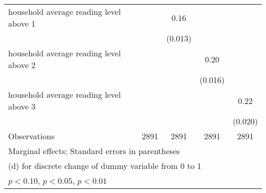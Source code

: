 \begin{table}[htbp]
\begin{tabular*}{1\hsize}{@{\hskip\tabcolsep\extracolsep\fill}l*{4}{c}}
household average reading level above 1&                  &     0.16\sym{***}&                  &                  \\
                &                  &  (0.013)         &                  &                  \\
household average reading level above 2&                  &                  &     0.20\sym{***}&                  \\
                &                  &                  &  (0.016)         &                  \\
household average reading level above 3&                  &                  &                  &     0.22\sym{***}\\
                &                  &                  &                  &  (0.020)         \\
\midrule
Observations    &     2891         &     2891         &     2891         &     2891         \\
\bottomrule
\multicolumn{5}{l}{\footnotesize Marginal effects; Standard errors in parentheses}\\
\multicolumn{5}{l}{\footnotesize  (d) for discrete change of dummy variable from 0 to 1}\\
\multicolumn{5}{l}{\footnotesize \sym{*} \(p<0.10\), \sym{**} \(p<0.05\), \sym{***} \(p<0.01\)}\\
\end{tabular*}
\end{table}
